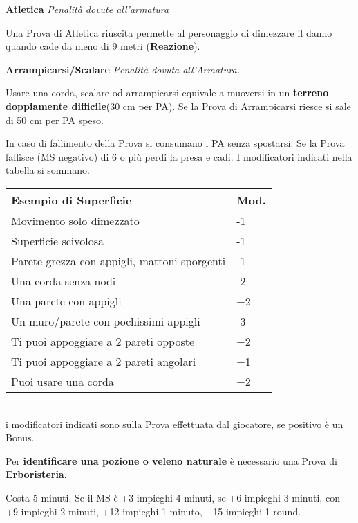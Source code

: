 \documentclass[12pt,a4paper,twoside,openany]{book}
\begin{document}
\begin{multicols}{2}
\textbf{Atletica} \textit{Penalità dovute all'armatura}

Una Prova di Atletica riuscita permette al personaggio di dimezzare il danno quando cade da meno di 9 metri (\textbf{Reazione}).

\medskip

\textbf{Arrampicarsi/Scalare}  \textit{Penalità dovuta all'Armatura.}

\medskip

Usare una corda, scalare od arrampicarsi equivale a muoversi in un \textbf{terreno doppiamente difficile}(30 cm per PA). Se la Prova di Arrampicarsi riesce si sale di 50 cm per PA speso.

In caso di fallimento della Prova si consumano i PA senza spostarsi. Se la Prova fallisce (MS negativo) di 6 o più perdi la presa e cadi. I modificatori indicati nella tabella si sommano.\\

\begin{tabularx}{0.45\textwidth}{Xl}
	\textbf{Esempio di Superficie} & Mod.\\
	\toprule
	Movimento solo dimezzato & -1\\
	Superficie scivolosa&-1\\
	Parete grezza con appigli, mattoni sporgenti&-1\\
	Una corda senza nodi&-2\\
	Una parete con appigli &+2\\
	Un muro/parete con pochissimi appigli&-3\\
	Ti puoi appoggiare a 2 pareti opposte&+2\\
	Ti puoi appoggiare a 2 pareti angolari&+1\\
	Puoi usare una corda&+2\\
\end{tabularx}\\

i modificatori indicati sono sulla Prova effettuata dal giocatore, se positivo è un Bonus.

\medskip

Per \textbf{identificare una pozione o veleno naturale} è necessario una Prova di \textbf{Erboristeria}.

Costa 5 minuti. Se il MS è +3 impieghi 4 minuti, se +6 impieghi 3 minuti, con +9 impieghi 2 minuti, +12 impieghi 1 minuto, +15 impieghi 1 round.


\end{multicols}
\end{document}
